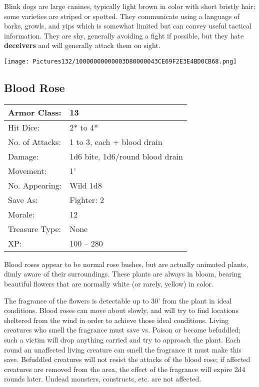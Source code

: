 \documentclass[a4paper,twoside,openany,10pt]{book}
\begin{document}
\begin{multicols}{2}
Blink dogs are large canines, typically light brown in color with short bristly hair; some varieties are striped or spotted. They communicate using a language of barks, growls, and yips which is somewhat limited but can convey useful tactical information. They are shy, generally avoiding a fight if possible, but they hate \textbf{deceivers} and will generally attack them on sight.


\begin{center}
	\texttt{[image: Pictures132/10000000000003D80000043CE69F2E3E4BD0CB68.png]}
\end{center}

\subsection*{Blood Rose}\label{blood-rose}

\begin{tabularx}{0.48\textwidth}{@{}lX@{}}
	Armor Class: & 13 \\\hline
Hit Dice: & 2* to 4* \\\hline
No. of Attacks: & 1 to 3, each + blood drain \\\hline
Damage: & 1d6 bite, 1d6/round blood drain \\\hline
Movement: & 1' \\\hline
No. Appearing: & Wild 1d8 \\\hline
Save As: & Fighter: 2 \\\hline
Morale: & 12 \\\hline
Treasure Type: & None \\\hline
XP: & 100 -- 280 \\\hline
\end{tabularx}\medskip

Blood roses appear to be normal rose bushes, but are actually animated plants, dimly aware of their surroundings. These plants are always in bloom, bearing beautiful flowers that are normally white (or rarely, yellow) in color.

The fragrance of the flowers is detectable up to 30' from the plant in ideal conditions. Blood roses can move about slowly, and will try to find locations sheltered from the wind in order to achieve those ideal conditions. Living creatures who smell the fragrance must save vs. Poison or become befuddled; such a victim will drop anything carried and try to approach the plant. Each round an unaffected living creature can smell the fragrance it must make this save. Befuddled creatures will not resist the attacks of the blood rose; if affected creatures are removed from the area, the effect of the fragrance will expire 2d4 rounds later. Undead monsters, constructs, etc. are not affected.


\end{multicols}
\end{document}

